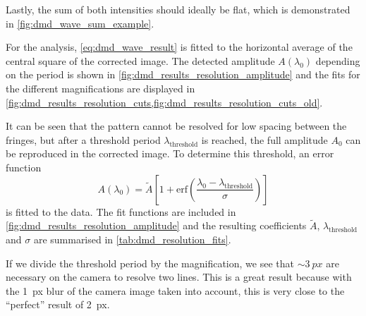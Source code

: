 Lastly, the sum of both intensities should ideally be flat, which is demonstrated in \cref{fig:dmd_wave_sum_example}.

For the analysis, \cref{eq:dmd_wave_result} is fitted to the horizontal average of the central square of the corrected image.
The detected amplitude $A(\lambda_0)$ depending on the period is shown in \cref{fig:dmd_results_resolution_amplitude} and the fits for the different magnifications are displayed in \cref{fig:dmd_results_resolution_cuts,fig:dmd_results_resolution_cuts_old}.

It can be seen that the pattern cannot be resolved for low spacing between the fringes, but after a threshold period $\lambda_\text{threshold}$ is reached, the full amplitude $A_0$ can be reproduced in the corrected image. To determine this threshold, an error function
\begin{equation}
    A(\lambda_0) = \tilde{A}\left[ 1 + \text{erf}\!\left(\frac{\lambda_0 - \lambda_\text{threshold}}{\sigma}\right) \right] \label{eq:errorfunction}
\end{equation}
is fitted to the data. The fit functions are included in \cref{fig:dmd_results_resolution_amplitude} and the resulting coefficients $\tilde{A}$, $\lambda_\text{threshold}$ and $\sigma$ are summarised in \cref{tab:dmd_resolution_fits}. 

If we divide the threshold period by the magnification, we see that $\sim\!\SI{3}{px}$ are necessary on the camera to resolve two lines. This is a great result because with the \SI{1}{px} blur of the camera image taken into account, this is very close to the \enquote{perfect} result of \SI{2}{px}.

